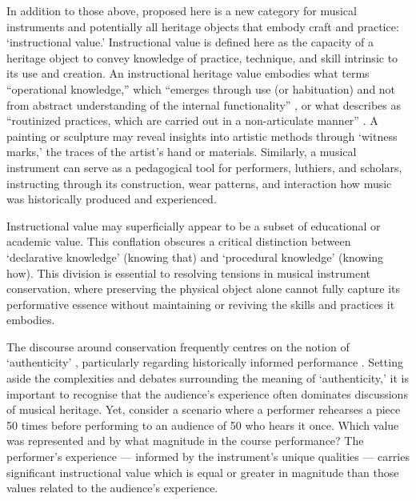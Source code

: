 In addition to those above, proposed here is a new category for musical instruments and potentially all heritage objects that embody craft and practice: `instructional value.' Instructional value is defined here as the capacity of a heritage object to convey knowledge of practice, technique, and skill intrinsic to its use and creation.
An instructional heritage value embodies what \citeauthor{magnusson_epistemic_2009} terms ``operational knowledge,'' which ``emerges through use (or habituation) and not from abstract understanding of the internal functionality'' \cite{magnusson_epistemic_2009}, or what \citeauthor{sennett_craftsman_2008} describes as ``routinized practices, which are carried out in a non-articulate manner'' \cite[p.~50]{sennett_craftsman_2008}.
A painting or sculpture may reveal insights into artistic methods through `witness marks,' the traces of the artist’s hand or materials. Similarly, a musical instrument can serve as a pedagogical tool for performers, luthiers, and scholars, instructing through its construction, wear patterns, and interaction how music was historically produced and experienced.

Instructional value may superficially appear to be a subset of educational or academic value. This conflation obscures a critical distinction between `declarative knowledge' (knowing that) and `procedural knowledge' (knowing how). This division is essential to resolving tensions in musical instrument conservation, where preserving the physical object alone cannot fully capture its performative essence without maintaining or reviving the skills and practices it embodies.

The discourse around conservation frequently centres on the notion of `authenticity' \cite{pine_museums_2007, laurenson_authenticity_2006}, particularly regarding historically informed performance \cite{davies_authenticity_2001}. Setting aside the complexities and debates surrounding the meaning of `authenticity,' it is important to recognise that the audience's experience often dominates discussions of musical heritage. Yet, consider a scenario where a performer rehearses a piece 50 times before performing to an audience of 50 who hears it once. Which value was represented and by what magnitude in the course performance? The performer’s experience --- informed by the instrument’s unique qualities --- carries significant instructional value which is equal or greater in magnitude than those values related to the audience's experience.

